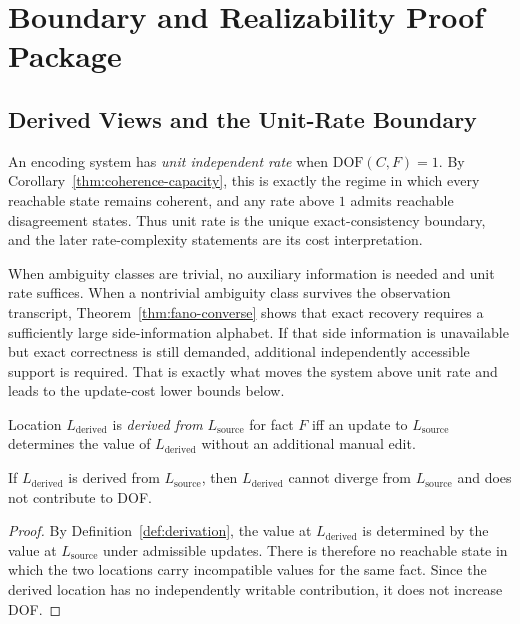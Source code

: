 \section{Boundary and Realizability Proof Package}\label{sec:appendix-boundary}

\subsection{Derived Views and the Unit-Rate Boundary}

An encoding system has \emph{unit independent rate} when $\text{DOF}(C,F)=1$. By Corollary~\ref{thm:coherence-capacity}, this is exactly the regime in which every reachable state remains coherent, and any rate above $1$ admits reachable disagreement states. Thus unit rate is the unique exact-consistency boundary, and the later rate-complexity statements are its cost interpretation.

When ambiguity classes are trivial, no auxiliary information is needed and unit rate suffices. When a nontrivial ambiguity class survives the observation transcript, Theorem~\ref{thm:fano-converse} shows that exact recovery requires a sufficiently large side-information alphabet. If that side information is unavailable but exact correctness is still demanded, additional independently accessible support is required. That is exactly what moves the system above unit rate and leads to the update-cost lower bounds below.

\begin{definition}[Derivation]\label{def:derivation}
Location $L_{\text{derived}}$ is \emph{derived from} $L_{\text{source}}$ for fact $F$ iff an update to $L_{\text{source}}$ determines the value of $L_{\text{derived}}$ without an additional manual edit.
\end{definition}

\begin{proposition}\label{thm:derivation-excludes}
If $L_{\text{derived}}$ is derived from $L_{\text{source}}$, then $L_{\text{derived}}$ cannot diverge from $L_{\text{source}}$ and does not contribute to DOF.
\end{proposition}

\begin{proof}
By Definition~\ref{def:derivation}, the value at $L_{\text{derived}}$ is determined by the value at $L_{\text{source}}$ under admissible updates. There is therefore no reachable state in which the two locations carry incompatible values for the same fact. Since the derived location has no independently writable contribution, it does not increase DOF.
\end{proof}

